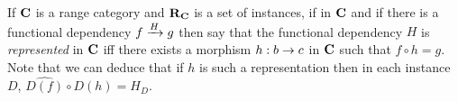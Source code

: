 \documentclass[10pt,a4paper]{article}
\theoremstyle{remark}
\renewcommand{\term}[1]{\textit{#1}}  %
\begin{document}
\begin{definition}
If $\catc$ is a range category and $\reqtc$ is a set of instances, if
\fgsourcediag
in $\catc$ 
and if there is a functional dependency $\fundep{H}{f}{g}$ then say that 
the functional dependency $H$ is \term{represented} in $\catc$ 
iff there exists a morphism $h:b \morph c$ in $\catc$ such that 
$f \circ h = g$. Note that we can deduce that if $h$ is such a representation then
in each instance $D$, $\widehat{D(f)} \circ D(h) = H_D$.
\end{definition}



 

\end{document}
